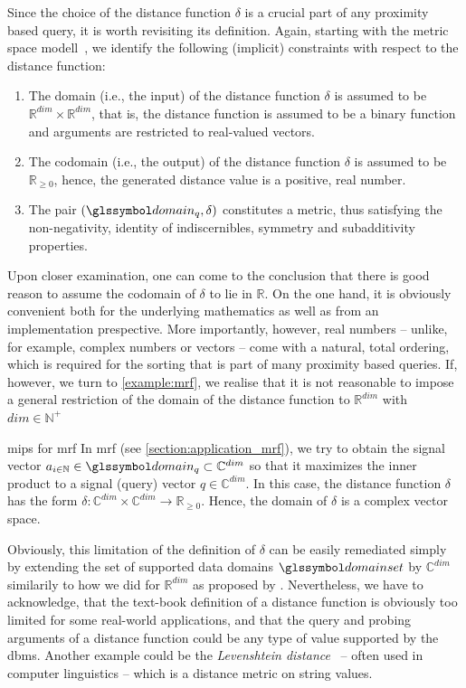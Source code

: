 Since the choice of the distance function $\delta$ is a crucial part of any proximity based query, it is worth revisiting its definition. Again, starting with the metric space modell~\cite{Zezula:2006similarity}, we identify the following (implicit) constraints with respect to the distance function:

\begin{enumerate}
    \item The domain (i.e., the input) of the distance function $\delta$ is assumed to be $\mathbb{R}^{dim} \times \mathbb{R}^{dim}$, that is, the distance function is assumed to be a binary function and arguments are restricted to real-valued vectors.
    \item The codomain (i.e., the output) of the distance function $\delta$ is assumed to be $\mathbb{R}_{\geq 0}$, hence, the generated distance value is a positive, real number.
    \item The pair $(\domain_q,\delta)$ constitutes a metric, thus satisfying the non-negativity, identity of indiscernibles, symmetry and subadditivity properties.
\end{enumerate}

Upon closer examination, one can come to the conclusion that there is good reason to assume the codomain of $\delta$ to lie in $\mathbb{R}$. On the one hand, it is obviously convenient both for the underlying mathematics as well as from an implementation prespective. More importantly, however, real numbers -- unlike, for example, complex numbers or vectors -- come with a natural, total ordering, which is required for the sorting that is part of many proximity based queries. If, however, we turn to \cref{example:mrf}, we realise that it is not reasonable to impose a general restriction of the domain of the distance function to $\mathbb{R}^{dim}$ with $dim \in \mathbb{N^{+}}$

\begin{example}[label=example:mrf]{\acrlong{mips}{} for \acrshort{mrf}}{}
    In \acrshort{mrf} (see \cref{section:application_mrf}), we try to obtain the signal vector $a_{i \in \mathbb{N}} \in \domain_q \subset \mathbb{C}^{dim}$ so that it maximizes the inner product to a signal (query) vector $q \in \mathbb{C}^{dim}$. In this case, the distance function $\delta$ has the form $\delta \colon \mathbb{C}^{dim} \times \mathbb{C}^{dim} \to \mathbb{R}_{\geq 0}$. Hence, the domain of $\delta$ is a complex vector space.
\end{example}

Obviously, this limitation of the definition of $\delta$ can be easily remediated simply by extending the set of supported data domains $\domainset$ by $\mathbb{C}^{dim}$ similarily to how we did for $\mathbb{R}^{dim}$ as proposed by \cite{Giangreco:2018thesis}. Nevertheless, we have to acknowledge, that the text-book definition of a distance function is obviously too limited for some real-world applications, and that the query and probing arguments of a distance function could be any type of value supported by the \acrshort{dbms}. Another example could be the \emph{Levenshtein distance}~\cite{Levensthtein:1965Binary} -- often used in computer linguistics -- which is a distance metric on string values.

